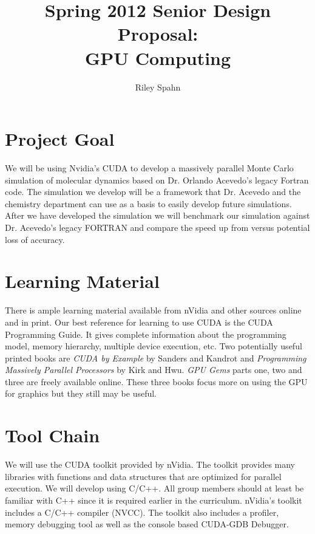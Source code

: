 \setlength{\topmargin}{-.8in}
\setlength{\textheight}{9in}
\setlength{\oddsidemargin}{.125in}
\setlength{\textwidth}{6.5in}

\title{Spring 2012 Senior Design Proposal:\\
GPU Computing}
\author{Riley Spahn}
\renewcommand{\today}{December 2011}
\maketitle

\section*{Project Goal}
We will be using Nvidia's CUDA to develop a massively parallel Monte Carlo 
simulation of molecular dynamics based on Dr. Orlando Acevedo's legacy Fortran code.
The simulation we develop will be a framework that Dr. Acevedo and the chemistry
department can use as a basis to easily develop future simulations.  After we
have developed the simulation we will benchmark our simulation against Dr.
Acevedo's legacy FORTRAN and compare the speed up from versus potential loss of
accuracy.

\section*{Learning Material}
There is ample learning material available from nVidia and other sources online
and in print.  Our best reference for learning to use CUDA is the CUDA
Programming Guide.  It gives complete information about the programming model,
memory hierarchy, multiple device execution, etc.
Two potentially useful printed books are \emph{CUDA by Example} by Sanders and
Kandrot and \emph{Programming Massively Parallel Processors} by Kirk and Hwu.
\emph{GPU Gems} parts one, two and three are freely available online.  These
three books focus more on using the GPU for graphics but they still may be useful.

\section*{Tool Chain}
We will use the CUDA toolkit provided by nVidia.  The toolkit provides many
libraries with functions and data structures that are optimized for parallel
execution.  We will develop using C/C++.  All group members should at least be
familiar with C++ since it is required earlier in the curriculum.  nVidia's
toolkit includes a C/C++ compiler (NVCC).  The toolkit also includes a profiler,
memory debugging tool as well as the console based CUDA-GDB Debugger.

